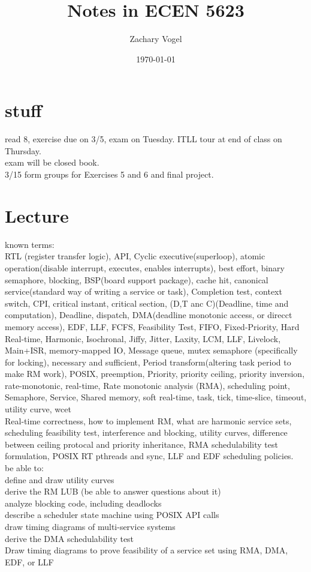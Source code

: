 \documentclass{article}
\author{Zachary Vogel}
\date{\today}
\title{Notes in ECEN 5623}
\begin{document}
\maketitle


\section*{stuff}
read 8, exercise due on 3/5, exam on Tuesday. ITLL tour at end of class on Thursday.\\
exam will be closed book.\\
3/15 form groups for Exercises 5 and 6 and final project.\\

\section*{Lecture}
known terms:\\
RTL (register transfer logic), API, Cyclic executive(superloop), atomic operation(disable interrupt, executes, enables interrupts), best effort, binary semaphore, blocking, BSP(board support package), cache hit, canonical service(standard way of writing a service or task), Completion test, context switch, CPI, critical instant, critical section, (D,T anc C)(Deadline, time and computation), Deadline, dispatch, DMA(deadline monotonic access, or direcct memory access), EDF, LLF, FCFS, Feasibility Test, FIFO, Fixed-Priority, Hard Real-time,
Harmonic, Isochronal, Jiffy, Jitter, Laxity, LCM, LLF, Livelock, Main+ISR, memory-mapped IO, Message queue, mutex semaphore (specifically for locking), necessary and sufficient, Period transform(altering task period to make RM work), POSIX, preemption, Priority, priority ceiling, priority inversion, rate-monotonic, real-time, Rate monotonic analysis (RMA), scheduling point, Semaphore, Service, Shared memory, soft real-time, task, tick, time-slice, timeout, utility curve, wcet\\

Real-time correctness, how to implement RM, what are harmonic service sets, scheduling feasibility test, interference and blocking, utility curves, difference between ceiling protocal and priority inheritance, RMA schedulability test formulation, POSIX RT pthreads and sync, LLF and EDF scheduling policies.\\

be able to:\\
define and draw utility curves\\
derive the RM LUB (be able to answer questions about it)\\
analyze blocking code, including deadlocks\\
describe a scheduler state machine using POSIX API calls\\
draw timing diagrams of multi-service systems\\
derive the DMA schedulability test\\
Draw timing diagrams to prove feasibility of a service set using RMA, DMA, EDF, or LLF\\
\end{document}
